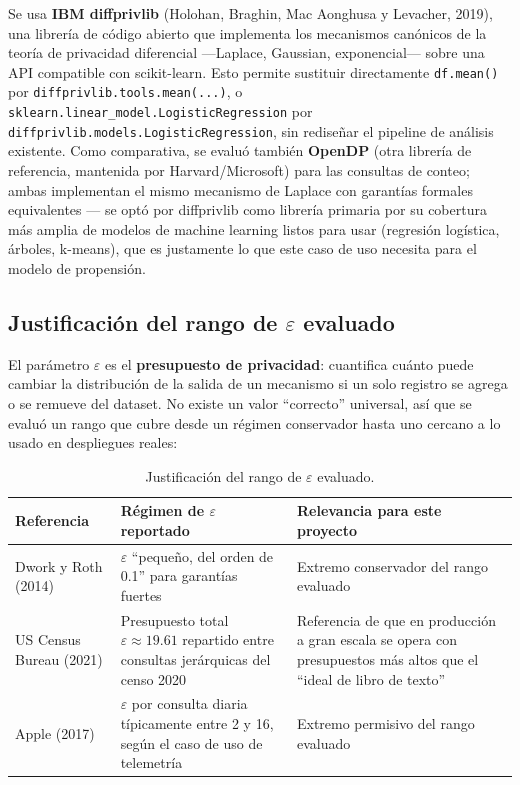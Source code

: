 \documentclass[11pt,a4paper]{article}
\newcommand{\eps}{\ensuremath{\varepsilon}}
\begin{document}
Se usa \textbf{IBM diffprivlib} (Holohan, Braghin, Mac Aonghusa y Levacher, 2019), una librería de
código abierto que implementa los mecanismos canónicos de la teoría de privacidad diferencial
---Laplace, Gaussian, exponencial--- sobre una API compatible con scikit-learn. Esto permite
sustituir directamente \texttt{df.mean()} por \texttt{diffprivlib.tools.mean(...)}, o
\texttt{sklearn.linear\_model.LogisticRegression} por
\texttt{diffprivlib.models.LogisticRegression}, sin rediseñar el pipeline de análisis existente.
Como comparativa, se evaluó también \textbf{OpenDP} (otra librería de referencia, mantenida por
Harvard/Microsoft) para las consultas de conteo; ambas implementan el mismo mecanismo de Laplace
con garantías formales equivalentes --- se optó por diffprivlib como librería primaria por su
cobertura más amplia de modelos de machine learning listos para usar (regresión logística,
árboles, k-means), que es justamente lo que este caso de uso necesita para el modelo de
propensión.

\subsection{Justificación del rango de \texorpdfstring{\eps}{epsilon} evaluado}

El parámetro \eps{} es el \textbf{presupuesto de privacidad}: cuantifica cuánto puede cambiar la
distribución de la salida de un mecanismo si un solo registro se agrega o se remueve del dataset.
No existe un valor ``correcto'' universal, así que se evaluó un rango que cubre desde un régimen
conservador hasta uno cercano a lo usado en despliegues reales:

\begin{table}[htbp]
\centering
\small
\begin{tabularx}{\textwidth}{@{}p{3.4cm}p{4cm}X@{}}
\toprule
\textbf{Referencia} & \textbf{Régimen de \eps{} reportado} & \textbf{Relevancia para este
proyecto} \\
\midrule
Dwork y Roth (2014) & \eps{} ``pequeño, del orden de 0.1'' para garantías fuertes & Extremo
conservador del rango evaluado \\
US Census Bureau (2021) & Presupuesto total $\eps\approx19.61$ repartido entre consultas
jerárquicas del censo 2020 & Referencia de que en producción a gran escala se opera con
presupuestos más altos que el ``ideal de libro de texto'' \\
Apple (2017) & \eps{} por consulta diaria típicamente entre 2 y 16, según el caso de uso de
telemetría & Extremo permisivo del rango evaluado \\
\bottomrule
\end{tabularx}
\caption{Justificación del rango de \eps{} evaluado.}
\end{table}
\end{document}
